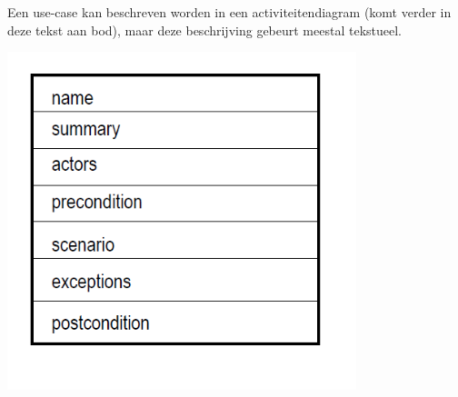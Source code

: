 Een use-case kan beschreven worden in een activiteitendiagram (komt verder in deze tekst aan bod), maar deze beschrijving gebeurt meestal tekstueel.


\begin{center}
\includegraphics[width=4in]{img/usecase2}%
\end{center}

